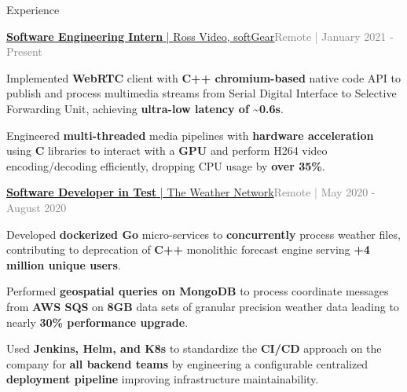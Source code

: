 \documentclass[hidelinks]{resume} %
\begin{document}
\begin{rSection}{Experience}
\begin{rSubsection}{\href{https://www.rossvideo.com/products-services/infrastructure/softgear-software-based-signal-processing-platform/}{\textbf{Software Engineering Intern}{ | Ross Video, \underline{softGear}}}}{\textcolor{gray}{Remote | January 2021 - Present}}{}

    \begin{bulletpoints}
        \vspace{-.10cm}
        \item Implemented \textbf{WebRTC} client with \textbf{C++ chromium-based} native code API to publish and process multimedia streams from Serial Digital Interface to Selective Forwarding Unit, achieving \textbf{ultra-low latency of \textasciitilde0.6s}.
        \vspace{-.13cm}
        \item Engineered \textbf{multi-threaded} media pipelines with \textbf{hardware acceleration} using \textbf{C} libraries to interact with a \textbf{GPU} and perform H264 video encoding/decoding efficiently, dropping CPU usage by \textbf{over 35\%}.
        \vspace{-.10cm}
    \end{bulletpoints}
    \vspace{-.25cm}
\end{rSubsection}
\begin{rSubsection}{\href{https://www.theweathernetwork.com/}{\textbf{Software Developer in Test}{ | The Weather Network}}}{\textcolor{gray}{Remote | May 2020 - August 2020}}{}
        \par
        \begin{bulletpoints}
            \vspace{-.10cm}
            \item Developed \textbf{dockerized Go} micro-services to \textbf{concurrently} process weather files, contributing to deprecation of \textbf{C++} monolithic forecast engine serving \textbf{+4 million unique users}.
             \vspace{-.13cm}
            \item Performed \textbf{geospatial queries on MongoDB} to process coordinate messages from \textbf{AWS SQS} on \textbf{8GB} data sets of granular precision weather data leading to nearly \textbf{30\% performance upgrade}.
            \vspace{-.13cm}
             \item Used \textbf{Jenkins, Helm, and K8s} to standardize the \textbf{CI/CD} approach on the company for \textbf{all backend teams} by engineering a configurable centralized \textbf{deployment pipeline} improving infrastructure maintainability.

\end{bulletpoints}
\end{rSubsection}
\end{rSection}
\end{document}
